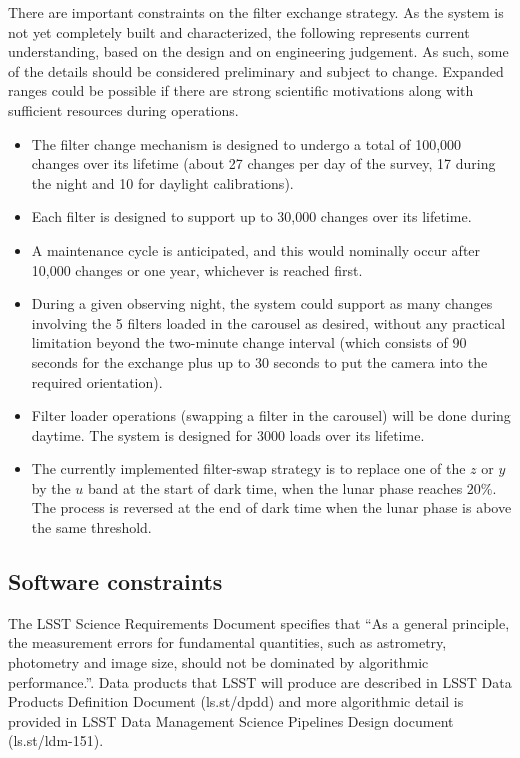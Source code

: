 \documentclass[DM,lsstdraft,toc,usenatbib]{lsstdoc}
\begin{document}
There are important constraints on the filter exchange strategy. As the system is not yet completely 
built and characterized, the following represents current understanding, based on the design and on 
engineering judgement. As such, some of the details should be considered preliminary and subject 
to change. Expanded ranges could be possible if there are strong scientific motivations along with
sufficient resources during operations.
\begin{itemize}
\item The filter change mechanism is designed to undergo a total of 100,000 changes over its lifetime 
	(about 27 changes per day of the survey, 17 during the night and 10 for daylight calibrations). 
\item Each filter is designed to support up to 30,000 changes over its lifetime.
\item A maintenance cycle is anticipated, and this would nominally occur after 10,000 changes or 
          one year, whichever is reached first. 
\item During a given observing night, the system could support as many changes involving the 5 filters 
          loaded in the carousel as desired, without any practical limitation beyond the two-minute change 
          interval (which consists of 90 seconds for the exchange plus up to 30 seconds to put the camera
          into the required orientation). 
\item Filter loader operations (swapping a filter in the carousel) will be done during daytime. The system 
          is designed for 3000 loads over its lifetime. 
\item The currently implemented filter-swap strategy is to replace one of the $z$ or $y$ 
	by the $u$ band at the start of dark time, when the lunar phase reaches $20\%$. The 
	process is reversed at the end of dark time when the lunar phase is above the same threshold. 	
\end{itemize} 


\subsection{Software constraints} 

The LSST Science Requirements Document specifies that ``As a general principle, the measurement errors
for fundamental quantities, such as astrometry, photometry and image size, should not be dominated by 
algorithmic performance.''. Data products that LSST will produce are described in LSST Data Products
Definition Document (ls.st/dpdd) and more algorithmic detail is provided in LSST Data Management 
Science Pipelines Design document (ls.st/ldm-151). 
\end{document}
